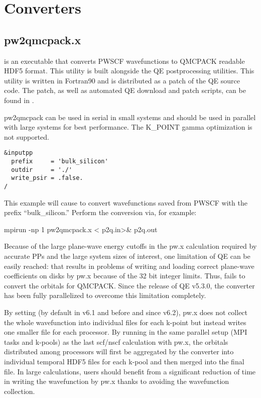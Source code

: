 \section{Converters} 
    
  \subsection{pw2qmcpack.x}
\label{sec:pw2qmcpack}
 is an executable that converts PWSCF wavefunctions to QMCPACK readable 
HDF5 format.  This utility is built alongside the QE postprocessing utilities.
This utility is written in Fortran90 and is distributed as a patch of the QE 
source code.  The patch, as well as automated QE download and patch scripts, can be found in 
.

pw2qmcpack can be used in serial in small systems and should be used in parallel with large systems for best performance. The K\_POINT gamma optimization is not supported.

\begin{lstlisting}[style=ESPRESSO,caption={Sample \ishell{pw2qmcpack.x} input file \ishell{p2q.in}}]
&inputpp
  prefix     = 'bulk_silicon'
  outdir     = './'
  write_psir = .false.
/
\end{lstlisting}

This example will cause  to convert wavefunctions saved from PWSCF with the prefix ``bulk\_silicon.'' Perform the conversion via, for example:

\begin{shade}
mpirun -np 1 pw2qmcpack.x < p2q.in>& p2q.out
\end{shade}

Because of the large plane-wave energy cutoffs in the pw.x calculation required by accurate PPs and the large system sizes of interest, one limitation of QE can be easily reached:
that  results in problems of writing and loading correct plane-wave coefficients on disks by pw.x because of the 32 bit integer limits. Thus,  fails to convert the orbitals for QMCPACK. Since the release of QE v5.3.0, the converter has been fully parallelized to overcome this limitation completely.

By setting  (by default  in v6.1 and before and  since v6.2), pw.x does not collect the whole wavefunction into individual files for each k-point but instead writes one smaller file for each processor.
By running  in the same parallel setup (MPI tasks and k-pools) as the last scf/nscf calculation with pw.x,
the orbitals distributed among processors will first be aggregated by the converter into individual temporal HDF5 files for each k-pool and then merged into the final file.
In large calculations, users should benefit from a significant reduction of time in writing the wavefunction by pw.x thanks to avoiding the wavefunction collection.

